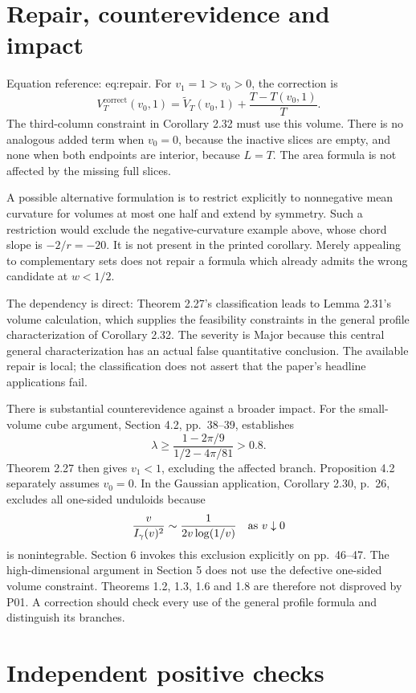 \documentclass[10pt]{article}
\begin{document}
\section*{Repair, counterevidence and impact}
Equation reference: eq:repair. For \(v_1=1>v_0>0\), the correction is \[
 V_T^{\mathrm{correct}}(v_0,1)
 =\widetilde V_T(v_0,1)+\frac{T-T(v_0,1)}T.\] The third-column constraint in Corollary 2.32 must use this volume. There is no analogous added term when \(v_0=0\), because the inactive slices are empty, and none when both endpoints are interior, because \(L=T\). The area formula is not affected by the missing full slices.\par
A possible alternative formulation is to restrict explicitly to nonnegative mean curvature for volumes at most one half and extend by symmetry. Such a restriction would exclude the negative-curvature example above, whose chord slope is \(-2/r=-20\). It is not present in the printed corollary. Merely appealing to complementary sets does not repair a formula which already admits the wrong candidate at \(w<1/2\).\par
The dependency is direct: Theorem 2.27’s classification leads to Lemma 2.31’s volume calculation, which supplies the feasibility constraints in the general profile characterization of Corollary 2.32. The severity is Major because this central general characterization has an actual false quantitative conclusion. The available repair is local; the classification does not assert that the paper’s headline applications fail.\par
There is substantial counterevidence against a broader impact. For the small-volume cube argument, Section 4.2, pp. 38–39, establishes \[\lambda\geq
 \frac{1-2\pi/9}{1/2-4\pi/81}>0.8.\] Theorem 2.27 then gives \(v_1<1\), excluding the affected branch. Proposition 4.2 separately assumes \(v_0=0\). In the Gaussian application, Corollary 2.30, p. 26, excludes all one-sided unduloids because \[\frac{v}{I_\gamma(v)^2}\sim\frac{1}{2v\log(1/v)}
 \quad\hbox{as }v\downarrow0\] is nonintegrable. Section 6 invokes this exclusion explicitly on pp. 46–47. The high-dimensional argument in Section 5 does not use the defective one-sided volume constraint. Theorems 1.2, 1.3, 1.6 and 1.8 are therefore not disproved by P01. A correction should check every use of the general profile formula and distinguish its branches.\par
\section*{Independent positive checks}
\end{document}
